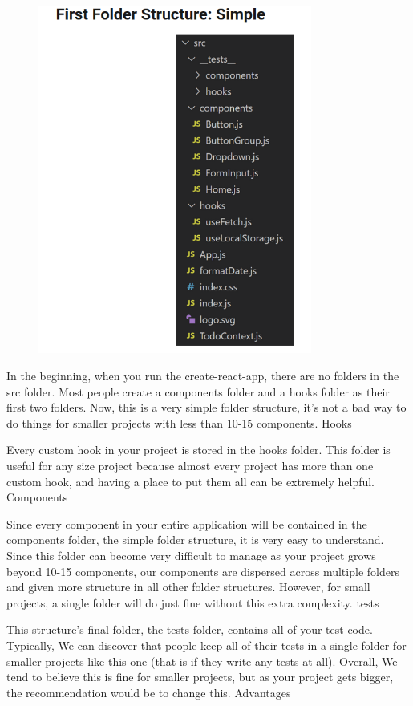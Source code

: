 \begin{figure}[h]
  \center
  \begin{minipage}{10cm}
    \includegraphics[width=9cm]{Develop/Languages/JavaScript/Frameworks/React/images/FoldersSimpleReact.png}
  \end{minipage}
\end{figure}


In the beginning, when you run the create-react-app, there are no folders in the src folder. Most people create a components folder and a hooks folder as their first two folders. Now, this is a very simple folder structure, it's not a bad way to do things for smaller projects with less than 10-15 components.
Hooks

Every custom hook in your project is stored in the hooks folder. This folder is useful for any size project because almost every project has more than one custom hook, and having a place to put them all can be extremely helpful.
Components

Since every component in your entire application will be contained in the components folder, the simple folder structure, it is very easy to understand. Since this folder can become very difficult to manage as your project grows beyond 10-15 components, our components are dispersed across multiple folders and given more structure in all other folder structures. However, for small projects, a single folder will do just fine without this extra complexity.
tests

This structure's final folder, the tests folder, contains all of your test code. Typically, We can discover that people keep all of their tests in a single folder for smaller projects like this one (that is if they write any tests at all). Overall, We tend to believe this is fine for smaller projects, but as your project gets bigger, the recommendation would be to change this.
Advantages

